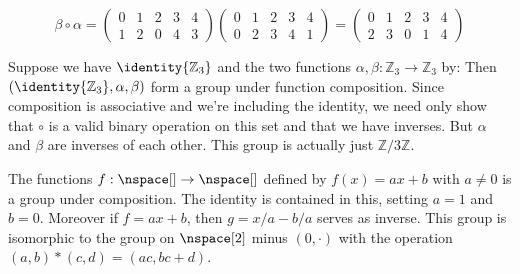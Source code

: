 \documentclass{article}                                                        %
\begin{document}
\begin{example}
                \begin{equation}
                    \beta\circ\alpha=
                    \begin{pmatrix}
                        0&1&2&3&4\\
                        1&2&0&4&3
                    \end{pmatrix}
                    \begin{pmatrix}
                        0&1&2&3&4\\
                        0&2&3&4&1
                    \end{pmatrix}
                    =
                    \begin{pmatrix}
                        0&1&2&3&4\\
                        2&3&0&1&4
                    \end{pmatrix}
                \end{equation}
            \end{example}
            \begin{example}
                Suppose we have $\identity{\mathbb{Z}_{3}}$ and the two
                functions $\alpha,\beta:\mathbb{Z}_{3}\rightarrow\mathbb{Z}_{3}$
                by:
                Then $(\identity{\mathbb{Z}_{3}},\alpha,\beta)$ form a group
                under function composition. Since composition is associative and
                we're including the identity, we need only show that $\circ$ is
                a valid binary operation on this set and that we have inverses.
                But $\alpha$ and $\beta$ are inverses of each other. This group
                is actually just $\mathbb{Z}/3\mathbb{Z}$.
            \end{example}
            \begin{example}
                The functions $f:\nspace[]\rightarrow\nspace[]$ defined by
                $f(x)=ax+b$ with $a\ne{0}$ is a group under composition. The
                identity is contained in this, setting $a=1$ and $b=0$. Moreover
                if $f=ax+b$, then $g=x/a-b/a$ serves as inverse. This group is
                isomorphic to the group on $\nspace[2]$ minus $(0,\cdot)$ with
                the operation $(a,b)*(c,d)=(ac,bc+d)$.
            \end{example}
\end{document}
